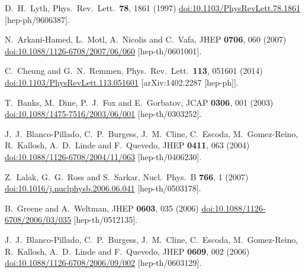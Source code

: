 \documentclass[12pt]{article}
\begin{document}
\begin{thebibliography}{99}
  D.~H.~Lyth,
  Phys.\ Rev.\ Lett.\  {\bf 78}, 1861 (1997)
  \href{https://dx.doi.org/10.1103/PhysRevLett.78.1861}{doi:10.1103/PhysRevLett.78.1861}
  [hep-ph/9606387].

  N.~Arkani-Hamed, L.~Motl, A.~Nicolis and C.~Vafa,
  JHEP {\bf 0706}, 060 (2007)
  \href{https://dx.doi.org/10.1088/1126-6708/2007/06/060}{doi:10.1088/1126-6708/2007/06/060}
  [hep-th/0601001].

  C.~Cheung and G.~N.~Remmen,
  Phys.\ Rev.\ Lett.\  {\bf 113}, 051601 (2014)
  \href{https://dx.doi.org/10.1103/PhysRevLett.113.051601}{doi:10.1103/PhysRevLett.113.051601}
  [arXiv:1402.2287 [hep-ph]].

  T.~Banks, M.~Dine, P.~J.~Fox and E.~Gorbatov,
  JCAP {\bf 0306}, 001 (2003)
  \href{https://dx.doi.org/10.1088/1475-7516/2003/06/001}{doi:10.1088/1475-7516/2003/06/001}
  [hep-th/0303252].

  J.~J.~Blanco-Pillado, C.~P.~Burgess, J.~M.~Cline, C.~Escoda, M.~Gomez-Reino, R.~Kallosh, A.~D.~Linde and F.~Quevedo,
  JHEP {\bf 0411}, 063 (2004)
  \href{https://dx.doi.org/10.1088/1126-6708/2004/11/063}{doi:10.1088/1126-6708/2004/11/063}
  [hep-th/0406230].

  Z.~Lalak, G.~G.~Ross and S.~Sarkar,
  Nucl.\ Phys.\ B {\bf 766}, 1 (2007)
  \href{https://dx.doi.org/10.1016/j.nuclphysb.2006.06.041}{doi:10.1016/j.nuclphysb.2006.06.041}
  [hep-th/0503178].

  B.~Greene and A.~Weltman,
  JHEP {\bf 0603}, 035 (2006)
  \href{https://dx.doi.org/10.1088/1126-6708/2006/03/035}{doi:10.1088/1126-6708/2006/03/035}
  [hep-th/0512135].

  J.~J.~Blanco-Pillado, C.~P.~Burgess, J.~M.~Cline, C.~Escoda, M.~Gomez-Reino, R.~Kallosh, A.~D.~Linde and F.~Quevedo,
  JHEP {\bf 0609}, 002 (2006)
  \href{https://dx.doi.org/10.1088/1126-6708/2006/09/002}{doi:10.1088/1126-6708/2006/09/002}
  [hep-th/0603129].


\end{thebibliography}
\end{document}
